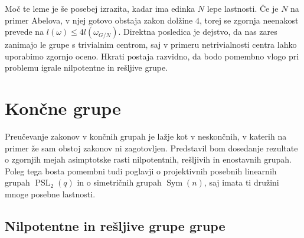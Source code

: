 \documentclass[12pt,a4paper]{article}
\newcounter{theoremcounter}[section] %
\newtheorem{definicija}[theoremcounter]{Definicija}
\begin{document}
\noindent
Moč te leme je še posebej izrazita, kadar ima edinka $N$ lepe lastnosti. Če je $N$ na primer Abelova, v njej gotovo obstaja zakon dolžine $4$, torej se zgornja neenakost prevede na $l(\omega) \le 4 l(\omega_{G/N})$. Direktna posledica je dejstvo, da
nas zares zanimajo le grupe s trivialnim centrom, saj v primeru netrivialnosti centra lahko uporabimo zgornjo oceno. Hkrati postaja razvidno, da bodo pomembno vlogo pri problemu igrale nilpotentne in rešljive grupe.

\section{Končne grupe}
Preučevanje zakonov v končnih grupah je lažje kot v neskončnih, v katerih na primer že sam obstoj zakonov ni zagotovljen. Predstavil bom dosedanje rezultate o zgornjih mejah asimptotske rasti nilpotentnih, rešljivih in enostavnih grupah. Poleg tega bosta pomembni tudi poglavji o
projektivnih posebnih linearnih grupah $\operatorname{PSL}_2(q)$ in o simetričnih grupah $\operatorname{Sym}(n)$, saj imata ti družini mnoge posebne lastnosti.

\subsection{Nilpotentne in rešljive grupe grupe}


\end{document}
